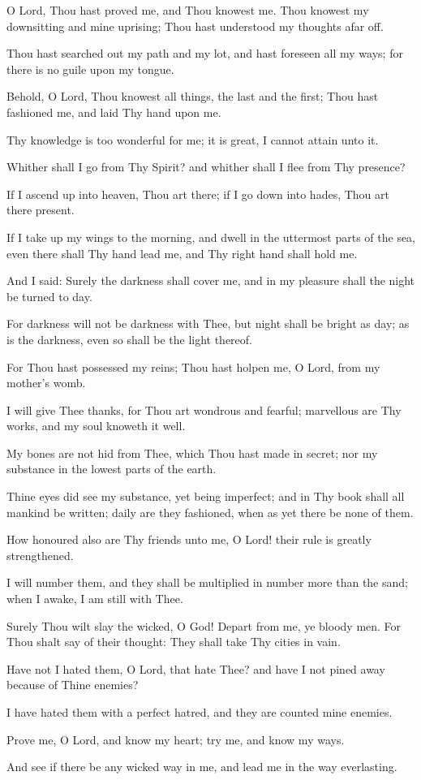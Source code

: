 O Lord, Thou hast proved me, and Thou knowest me. Thou knowest my downsitting and mine uprising; Thou hast understood my thoughts afar off.

Thou hast searched out my path and my lot, and hast foreseen all my ways; for there is no guile upon my tongue.

Behold, O Lord, Thou knowest all things, the last and the first; Thou hast fashioned me, and laid Thy hand upon me.

Thy knowledge is too wonderful for me; it is great, I cannot attain unto it.

Whither shall I go from Thy Spirit? and whither shall I flee from Thy presence?

If I ascend up into heaven, Thou art there; if I go down into hades, Thou art there present.

If I take up my wings to the morning, and dwell in the uttermost parts of the sea, even there shall Thy hand lead me, and Thy right hand shall hold me.

And I said: Surely the darkness shall cover me, and in my pleasure shall the night be turned to day.

For darkness will not be darkness with Thee, but night shall be bright as day; as is the darkness, even so shall be the light thereof.

For Thou hast possessed my reins; Thou hast holpen me, O Lord, from my mother's womb.

I will give Thee thanks, for Thou art wondrous and fearful; marvellous are Thy works, and my soul knoweth it well.

My bones are not hid from Thee, which Thou hast made in secret; nor my substance in the lowest parts of the earth.

Thine eyes did see my substance, yet being imperfect; and in Thy book shall all mankind be written; daily are they fashioned, when as yet there be none of them.

How honoured also are Thy friends unto me, O Lord! their rule is greatly strengthened.

I will number them, and they shall be multiplied in number more than the sand; when I awake, I am still with Thee.

Surely Thou wilt slay the wicked, O God! Depart from me, ye bloody men. For Thou shalt say of their thought: They shall take Thy cities in vain.

Have not I hated them, O Lord, that hate Thee? and have I not pined away because of Thine enemies?

I have hated them with a perfect hatred, and they are counted mine enemies.

Prove me, O Lord, and know my heart; try me, and know my ways.

And see if there be any wicked way in me, and lead me in the way everlasting.
